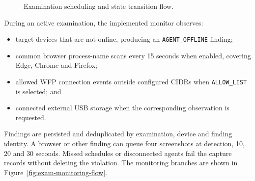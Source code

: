 \documentclass[12pt,a4paper]{report}
\begin{document}
\begin{figure}[H]
\centering
{}
\caption{Examination scheduling and state transition flow.}
\label{fig:exam-scheduling-flow}
\end{figure}

During an active examination, the implemented monitor observes:
\begin{itemize}
\item target devices that are not online, producing an \texttt{AGENT\_OFFLINE}
finding;
\item common browser process-name scans every 15 seconds when enabled,
covering Edge, Chrome and Firefox;
\item allowed WFP connection events outside configured CIDRs when
\texttt{ALLOW\_LIST} is selected; and
\item connected external USB storage when the corresponding observation is
requested.
\end{itemize}
Findings are persisted and deduplicated by examination, device and finding
identity. A browser or other finding can queue four screenshots at detection,
10, 20 and 30 seconds. Missed schedules or disconnected agents fail the
capture records without deleting the violation. The monitoring branches are
shown in Figure~\ref{fig:exam-monitoring-flow}.
\end{document}
